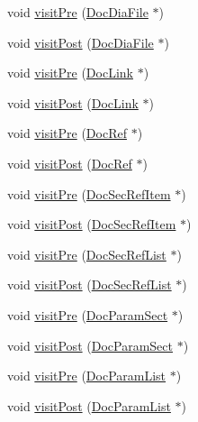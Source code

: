 \begin{DoxyCompactItemize}
\item 
void \hyperlink{class_perl_mod_doc_visitor_a7a25b1b36d08e2e037e060ccc392d6f9}{visit\+Pre} (\hyperlink{class_doc_dia_file}{Doc\+Dia\+File} $\ast$)
\item 
void \hyperlink{class_perl_mod_doc_visitor_ab553be6e0d7d97a307b790fe5142ea3e}{visit\+Post} (\hyperlink{class_doc_dia_file}{Doc\+Dia\+File} $\ast$)
\item 
void \hyperlink{class_perl_mod_doc_visitor_a5b20a41b7514a544b69613276f3c28d1}{visit\+Pre} (\hyperlink{class_doc_link}{Doc\+Link} $\ast$)
\item 
void \hyperlink{class_perl_mod_doc_visitor_a57fcd7b4cfa0933e88220ea56e342b60}{visit\+Post} (\hyperlink{class_doc_link}{Doc\+Link} $\ast$)
\item 
void \hyperlink{class_perl_mod_doc_visitor_a84c1914ef60158d75ad31da447ea1290}{visit\+Pre} (\hyperlink{class_doc_ref}{Doc\+Ref} $\ast$)
\item 
void \hyperlink{class_perl_mod_doc_visitor_a68538fc23381b18c2753510bd83ad5fe}{visit\+Post} (\hyperlink{class_doc_ref}{Doc\+Ref} $\ast$)
\item 
void \hyperlink{class_perl_mod_doc_visitor_a6f83e747cf5ba0a1d39b696677f21f84}{visit\+Pre} (\hyperlink{class_doc_sec_ref_item}{Doc\+Sec\+Ref\+Item} $\ast$)
\item 
void \hyperlink{class_perl_mod_doc_visitor_acd11b9e0c5ec2f7059b01a01431f7c02}{visit\+Post} (\hyperlink{class_doc_sec_ref_item}{Doc\+Sec\+Ref\+Item} $\ast$)
\item 
void \hyperlink{class_perl_mod_doc_visitor_a0ad8c067dda6c9f0b1324619f35b30bd}{visit\+Pre} (\hyperlink{class_doc_sec_ref_list}{Doc\+Sec\+Ref\+List} $\ast$)
\item 
void \hyperlink{class_perl_mod_doc_visitor_aee26774029b00750c58c893c7115687b}{visit\+Post} (\hyperlink{class_doc_sec_ref_list}{Doc\+Sec\+Ref\+List} $\ast$)
\item 
void \hyperlink{class_perl_mod_doc_visitor_ab47ce7fa4327aa225bb95d1db9e714ae}{visit\+Pre} (\hyperlink{class_doc_param_sect}{Doc\+Param\+Sect} $\ast$)
\item 
void \hyperlink{class_perl_mod_doc_visitor_a1ab92f2863b11cf082571834b8a38b64}{visit\+Post} (\hyperlink{class_doc_param_sect}{Doc\+Param\+Sect} $\ast$)
\item 
void \hyperlink{class_perl_mod_doc_visitor_a369e160a2f9fcf923eaa3cf2f364ca7c}{visit\+Pre} (\hyperlink{class_doc_param_list}{Doc\+Param\+List} $\ast$)
\item 
void \hyperlink{class_perl_mod_doc_visitor_ad9726f68cc3c9a679c71527d1b004114}{visit\+Post} (\hyperlink{class_doc_param_list}{Doc\+Param\+List} $\ast$)

\end{DoxyCompactItemize}
